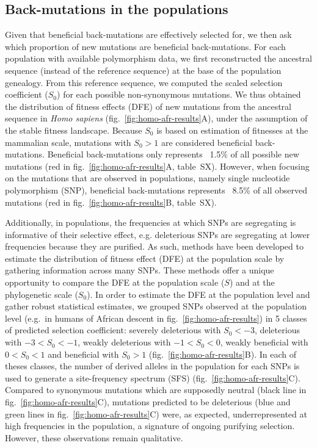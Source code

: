 \documentclass{article}
\newcommand{\Sphy}{S_{0}}
\newcommand{\divStrongDel}{\Sphy < -3}
\newcommand{\divDel}{-3 < \Sphy < -1}
\newcommand{\divWeakDel}{-1 < \Sphy < 0}
\newcommand{\divWeakAdv}{0 < \Sphy < 1}
\newcommand{\divAdv}{ \Sphy > 1}
\newcommand{\Spop}{S}
\begin{document}
    \subsection*{Back-mutations in the populations}
    Given that beneficial back-mutations are effectively selected for, we then ask which proportion of new mutations are beneficial back-mutations.
    For each population with available polymorphism data, we first reconstructed the ancestral sequence (instead of the reference sequence) at the base of the population genealogy.
    From this reference sequence, we computed the scaled selection coefficient ($\Sphy$) for each possible non-synonymous mutations.
    We thus obtained the distribution of fitness effects (DFE) of new mutations from the ancestral sequence in \textit{Homo sapiens} (fig.~\ref{fig:homo-afr-results}A), under the assumption of the stable fitness landscape.
    Because $\Sphy$ is based on estimation of fitnesses at the mammalian scale, mutations with $\Sphy>1$ are considered beneficial back-mutations.
    Beneficial back-mutations only represents ~1.5\% of all possible new mutations (red in fig.~\ref{fig:homo-afr-results}A, table~SX).
    However, when focusing on the mutations that are observed in populations, namely single nucleotide polymorphism (SNP), beneficial back-mutations represents ~8.5\% of all observed mutations (red in fig.~\ref{fig:homo-afr-results}B, table~SX).

    Additionally, in populations, the frequencies at which SNPs are segregating is informative of their selective effect, e.g. deleterious SNPs are segregating at lower frequencies because they are purified.
    As such, methods have been developed to estimate the distribution of fitness effect (DFE) at the population scale by gathering information across many SNPs\cite{eyre-walker_distribution_2006a, eyre-walker_estimating_2009a, galtier_adaptive_2016, tataru_inference_2017}.
    These methods offer a unique opportunity to compare the DFE at the population scale ($\Spop$) and at the phylogenetic scale ($\Sphy$).
    In order to estimate the DFE at the population level and gather robust statistical estimates, we grouped SNPs observed at the population level (e.g.~in humans of African descent in fig.~\ref{fig:homo-afr-results}) in 5 classes of predicted selection coefficient: severely deleterious with $\divStrongDel$, deleterious with $\divDel$, weakly deleterious with $\divWeakDel$, weakly beneficial with $\divWeakAdv$ and beneficial with $\divAdv$ (fig.~\ref{fig:homo-afr-results}B).
    In each of theses classes, the number of derived alleles in the population for each SNPs is used to generate a site-frequency spectrum (SFS) (fig.~\ref{fig:homo-afr-results}C).
    Compared to synonymous mutations which are supposedly neutral (black line in fig.~\ref{fig:homo-afr-results}C), mutations predicted to be deleterious (blue and green lines in fig.~\ref{fig:homo-afr-results}C) were, as expected, underrepresented at high frequencies in the population, a signature of ongoing purifying selection.
    However, these observations remain qualitative.
\end{document}
